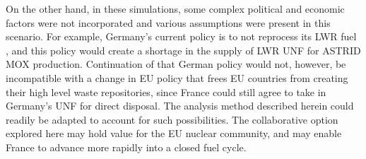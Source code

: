 On the other hand, in these simulations, some complex political and economic factors were not incorporated and various assumptions were present in this scenario. For
example, Germany's current policy is to not reprocess its \gls{LWR} fuel
\cite{topfer_germanys_2011}, and this policy would create a shortage
in the supply of \gls{LWR} \gls{UNF} for \gls{ASTRID} \gls{MOX} production.
Continuation of that German policy would not, however, be incompatible
with a change in \gls{EU} policy that frees \gls{EU} countries from
creating their high level waste repositories, since France could still
agree to take in Germany's \gls{UNF} for direct disposal. The analysis
method described herein could readily be adapted to account for such possibilities. 
The collaborative option explored here may hold value for the \gls{EU} nuclear community,
and may enable France to advance more rapidly into a closed fuel cycle. 

\FloatBarrier